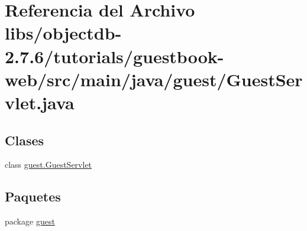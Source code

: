 \hypertarget{guestbook-web_2src_2main_2java_2guest_2_guest_servlet_8java}{}\section{Referencia del Archivo libs/objectdb-\/2.7.6/tutorials/guestbook-\/web/src/main/java/guest/\+Guest\+Servlet.java}
\label{guestbook-web_2src_2main_2java_2guest_2_guest_servlet_8java}
\subsection*{Clases}
\begin{DoxyCompactItemize}
\item 
class \mbox{\hyperlink{classguest_1_1_guest_servlet}{guest.\+Guest\+Servlet}}
\end{DoxyCompactItemize}
\subsection*{Paquetes}
\begin{DoxyCompactItemize}
\item 
package \mbox{\hyperlink{namespaceguest}{guest}}
\end{DoxyCompactItemize}
